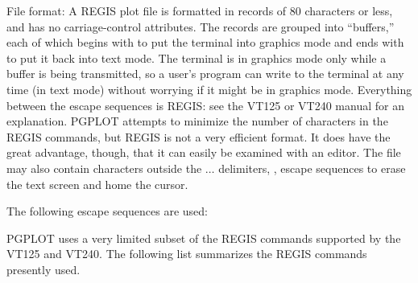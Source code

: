 \proclaim File format:
A REGIS plot file is formatted in records of 80 characters or less, and
has no carriage-control attributes. 
The records are
grouped into ``buffers,'' each of which begins with  to put the
terminal into graphics mode and ends with \esc{\tt $\backslash$} to put it back into
text mode.  The terminal is in graphics mode only while a buffer is
being transmitted, so a user's program can write to the terminal at any
time (in text mode) without worrying if it might be in graphics mode.
Everything between the escape sequences is REGIS: see the VT125 or VT240
manual for an explanation.  PGPLOT attempts to minimize the number of
characters in the REGIS commands, but REGIS is not a very efficient
format. It does have the great advantage, though, that it can easily be
examined with an editor.   The file may also contain characters outside
the $\ldots$ \esc {\tt $\backslash$} delimiters, \eg, escape
sequences to erase the text screen and home the cursor. 

The following escape sequences are used:
\smallskip
\halign{\indent\esc{\tt #}\hfil&\quad -- #\hfil\cr
[2J &Erase entire screen (text)\cr
[H  &Move cursor to home position\cr
Pp  &Enter REGIS graphics mode\cr
$\backslash$ &Leave REGIS graphics mode\cr
}
\smallskip


PGPLOT uses a very limited subset of the REGIS commands supported
by the VT125 and VT240. The following list summarizes the REGIS commands
presently used. 

